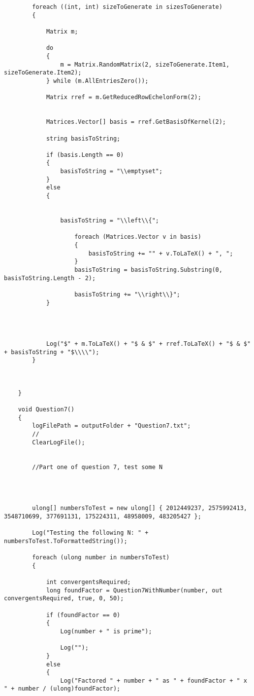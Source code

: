 \documentclass{article}
\begin{document}
\begin{lstlisting}
		foreach ((int, int) sizeToGenerate in sizesToGenerate)
		{
			
			Matrix m;
			
			do
			{
				m = Matrix.RandomMatrix(2, sizeToGenerate.Item1, sizeToGenerate.Item2);
			} while (m.AllEntriesZero());
			
			Matrix rref = m.GetReducedRowEchelonForm(2);
			
			
			Matrices.Vector[] basis = rref.GetBasisOfKernel(2);
			
			string basisToString;
			
			if (basis.Length == 0)
			{
				basisToString = "\\emptyset";
			}
			else
			{
				
				
				basisToString = "\\left\\{";
					
					foreach (Matrices.Vector v in basis)
					{
						basisToString += "" + v.ToLaTeX() + ", ";
					}
					basisToString = basisToString.Substring(0, basisToString.Length - 2);
					
					basisToString += "\\right\\}";
			}
			
			
			
			
			Log("$" + m.ToLaTeX() + "$ & $" + rref.ToLaTeX() + "$ & $" + basisToString + "$\\\\");
		}
		
		
		
	}
	
	void Question7()
	{
		logFilePath = outputFolder + "Question7.txt";
		//
		ClearLogFile();
		
		
		//Part one of question 7, test some N
		
		
		
		
		ulong[] numbersToTest = new ulong[] { 2012449237, 2575992413, 3548710699, 377691131, 175224311, 48958009, 483205427 };
		
		Log("Testing the following N: " + numbersToTest.ToFormattedString());
		
		foreach (ulong number in numbersToTest)
		{
			
			int convergentsRequired;
			long foundFactor = Question7WithNumber(number, out convergentsRequired, true, 0, 50);
			
			if (foundFactor == 0)
			{
				Log(number + " is prime");
				
				Log("");
			}
			else
			{
				Log("Factored " + number + " as " + foundFactor + " x " + number / (ulong)foundFactor);
				

\end{lstlisting}
\end{document}
